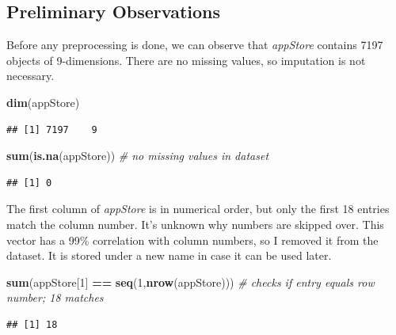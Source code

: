 \documentclass[]{article}
\newenvironment{Shaded}{\begin{snugshade}}{\end{snugshade}}
\newcommand{\KeywordTok}[1]{\textcolor[rgb]{0.13,0.29,0.53}{\textbf{#1}}}
\newcommand{\DecValTok}[1]{\textcolor[rgb]{0.00,0.00,0.81}{#1}}
\newcommand{\StringTok}[1]{\textcolor[rgb]{0.31,0.60,0.02}{#1}}
\newcommand{\CommentTok}[1]{\textcolor[rgb]{0.56,0.35,0.01}{\textit{#1}}}
\newcommand{\OperatorTok}[1]{\textcolor[rgb]{0.81,0.36,0.00}{\textbf{#1}}}
\newcommand{\NormalTok}[1]{#1}
\begin{document}
\subsection{Preliminary Observations}\label{preliminary-observations}

Before any preprocessing is done, we can observe that \emph{appStore}
contains 7197 objects of 9-dimensions. There are no missing values, so
imputation is not necessary.

\begin{Shaded}
\begin{Highlighting}[]
\KeywordTok{dim}\NormalTok{(appStore)}
\end{Highlighting}
\end{Shaded}

\begin{verbatim}
## [1] 7197    9
\end{verbatim}

\begin{Shaded}
\begin{Highlighting}[]
\KeywordTok{sum}\NormalTok{(}\KeywordTok{is.na}\NormalTok{(appStore))    }\CommentTok{# no missing values in dataset}
\end{Highlighting}
\end{Shaded}

\begin{verbatim}
## [1] 0
\end{verbatim}

The first column of \emph{appStore} is in numerical order, but only the
first 18 entries match the column number. It's unknown why numbers are
skipped over. This vector has a 99\% correlation with column numbers, so
I removed it from the dataset. It is stored under a new name in case it
can be used later.

\begin{Shaded}
\begin{Highlighting}[]
\KeywordTok{sum}\NormalTok{(appStore[}\DecValTok{1}\NormalTok{] }\OperatorTok{==}\StringTok{ }\KeywordTok{seq}\NormalTok{(}\DecValTok{1}\NormalTok{,}\KeywordTok{nrow}\NormalTok{(appStore))) }\CommentTok{# checks if entry equals row number; 18 matches}
\end{Highlighting}
\end{Shaded}

\begin{verbatim}
## [1] 18
\end{verbatim}

\begin{Shaded}
\end{Shaded}
\end{document}
